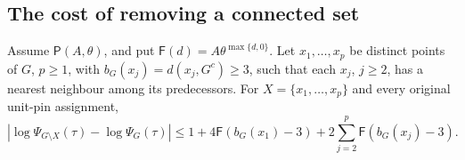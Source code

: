 \subsection{The cost of removing a connected set}

\begin{lemma}\label{l:removal}
Assume \(\mathsf P(A,\theta)\), and put
\(\mathsf F(d)=A\theta^{\max\{d,0\}}\).
Let \(x_1,\ldots,x_p\) be distinct points of \(G\), \(p\ge1\),
with \(b_G(x_j)=d(x_j,G^c)\ge3\), such that each \(x_j\), \(j\ge2\),
has a nearest neighbour among its predecessors.
For \(X=\{x_1,\ldots,x_p\}\) and every original unit-pin assignment,
\[
 |\log\Psi_{G\setminus X}(\tau)-\log\Psi_G(\tau)|
 \le1+4\mathsf F(b_G(x_1)-3)
                  +2\sum_{j=2}^p\mathsf F(b_G(x_j)-3).
\]
\end{lemma}

